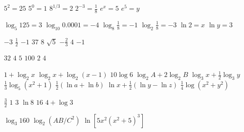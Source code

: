 \begin{Answer}[ref={exLogFunctions}]
\Question %
\begin{tasks}
	\task  $5^{2} =25$
	\task $5^{0} =1$
	\task $8^{1/3} =2$
	\task $2^{ -3} =\frac{1}{8}$ 
	\task $e^{x} =5$
	\task $e^{5} =y$ 
\end{tasks}

\Question %
\begin{tasks}
	\task  $\log _{5} 125 =3$
	\task  $\log _{10} 0.0001 = -4$
	\task $\log _{8} \frac{1}{8} = -1$
	\task $\log _{2} \frac{1}{8} = -3$
	\task $\ln  2 =x$
	\task $\ln  y =3$ 
\end{tasks}


\Question %
\begin{tasks}
	\task $ -3$
	\task $\frac{1}{2}$ 
	\task $ -1$ 
	\task $37$
	\task $8$
	\task $\sqrt{5}$
	\task $ -\frac{2}{3}$
	\task $4$
	\task $ -1$ 
\end{tasks}

\Question %
\begin{tasks}
	\task $32$
	\task $4$
	\task $5$
	\task $100$
	\task $2$
	\task $4$
\end{tasks}

\Question %
\begin{tasks}
	\task $1 +\log _{2} x$ 
	\task $\log _{2} x +\log _{2} \left (x -1\right )$ 
	\task $10 \log  6$
	\task $\log _{2} A +2 \log _{2} B$ 
	\task $\log _{3} x +\frac{1}{2} \log _{3} y$ 
	\task $\frac{1}{3} \log _{5} \left (x^{2} +1\right )$ 
	\task $\frac{1}{2} \left (\ln  a +\ln  b\right )$ 
	\task $\ln  x +\frac{1}{2} \left (\ln  y -\ln  z\right )$ 
	\task $\frac{1}{4} \log  \left (x^{2} +y^{2}\right )$ 
\end{tasks}

\Question %
\begin{tasks} 
	\task $\frac{3}{2}$
	\task $1$
	\task $3$ 
	\task $\ln  8$ 
	\task $16$
	\task $4 +\log  3$ 
\end{tasks}

\Question %
\begin{tasks}
	\task $\log _{3} 160$ 
	\task $\log _{2} \left (A B/C^{2}\right )$ 
	\task $\ln  \left [5 x^{2} \left (x^{2} +5\right )^{3}\right ]$ 
\end{tasks}


\end{Answer}
